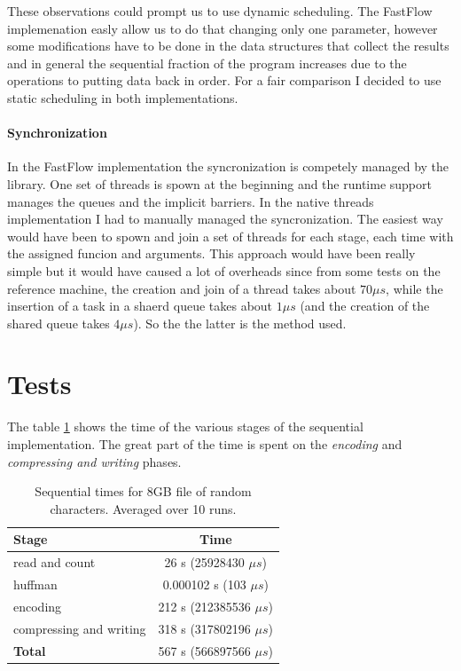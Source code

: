 \documentclass[12pt, letterpaper]{article}
\begin{document}
These observations could prompt us to use dynamic scheduling. The FastFlow implemenation easly allow us to do that changing only one parameter, however some modifications have to be done in the data structures that collect the results and in general the sequential fraction of the program increases due to the operations to putting data back in order. For a fair comparison I decided to use static scheduling in both implementations.

\paragraph*{Synchronization}
In the FastFlow implementation the syncronization is competely managed by the library. One set of threads is spown at the beginning and the runtime support manages the queues and the implicit barriers. In the native threads implementation I had to manually managed the syncronization. The easiest way would have been to spown and join a set of threads for each stage, each time with the assigned funcion and arguments. This approach would have been really simple but it would have caused a lot of overheads since from some tests on the reference machine, the creation and join of a thread takes about $70 \mu s$, while the insertion of a task in a shaerd queue takes about $1 \mu s$ (and the creation of the shared queue takes $4 \mu s$). So the the latter is the method used.




\section{Tests \label{sec:tests}}

The table \ref{tab:sequential_times} shows the time of the various stages of the sequential implementation. The great part of the time is spent on the \textit{encoding} and \textit{compressing and writing} phases.

\begin{table}[h]
\begin{center}
\begin{tabular}{l c}
    \textbf{Stage} & \textbf{Time}  \\
    \hline
    read and count & 26 s (25928430 $\mu s$) \\
    \hline
    huffman &  0.000102 s (103 $\mu s$) \\
    \hline
    encoding &  212 s  (212385536 $\mu s$) \\
    \hline
    compressing and writing & 318 s (317802196 $\mu s$) \\
    \hline
    \textbf{Total} & 567 s (566897566 $\mu s$) \\ 
\end{tabular}
\caption{Sequential times for 8GB file of random characters. Averaged over 10 runs.}
\label{tab:sequential_times}
\end{center}
\end{table}
\end{document}
